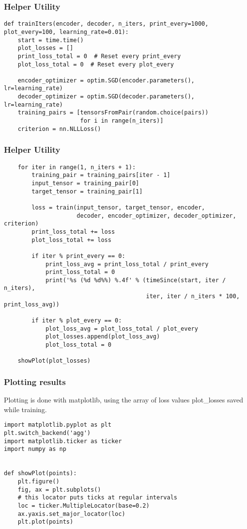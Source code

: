 \begin{frame}[fragile]
\frametitle{Helper Utility}
\begin{lstlisting}    
def trainIters(encoder, decoder, n_iters, print_every=1000, plot_every=100, learning_rate=0.01):
    start = time.time()
    plot_losses = []
    print_loss_total = 0  # Reset every print_every
    plot_loss_total = 0  # Reset every plot_every

    encoder_optimizer = optim.SGD(encoder.parameters(), lr=learning_rate)
    decoder_optimizer = optim.SGD(decoder.parameters(), lr=learning_rate)
    training_pairs = [tensorsFromPair(random.choice(pairs))
                      for i in range(n_iters)]
    criterion = nn.NLLLoss()
\end{lstlisting} 
              
\end{frame} 

\begin{frame}[fragile]
\frametitle{Helper Utility}
\begin{lstlisting}    
    for iter in range(1, n_iters + 1):
        training_pair = training_pairs[iter - 1]
        input_tensor = training_pair[0]
        target_tensor = training_pair[1]

        loss = train(input_tensor, target_tensor, encoder,
                     decoder, encoder_optimizer, decoder_optimizer, criterion)
        print_loss_total += loss
        plot_loss_total += loss

        if iter % print_every == 0:
            print_loss_avg = print_loss_total / print_every
            print_loss_total = 0
            print('%s (%d %d%%) %.4f' % (timeSince(start, iter / n_iters),
                                         iter, iter / n_iters * 100, print_loss_avg))

        if iter % plot_every == 0:
            plot_loss_avg = plot_loss_total / plot_every
            plot_losses.append(plot_loss_avg)
            plot_loss_total = 0

    showPlot(plot_losses)
\end{lstlisting} 
              
\end{frame} 

\begin{frame}[fragile]
\frametitle{Plotting results}
Plotting is done with matplotlib, using the array of loss values plot\_losses saved while training.
\begin{lstlisting}    
import matplotlib.pyplot as plt
plt.switch_backend('agg')
import matplotlib.ticker as ticker
import numpy as np


def showPlot(points):
    plt.figure()
    fig, ax = plt.subplots()
    # this locator puts ticks at regular intervals
    loc = ticker.MultipleLocator(base=0.2)
    ax.yaxis.set_major_locator(loc)
    plt.plot(points)
\end{lstlisting} 
              
\end{frame} 

